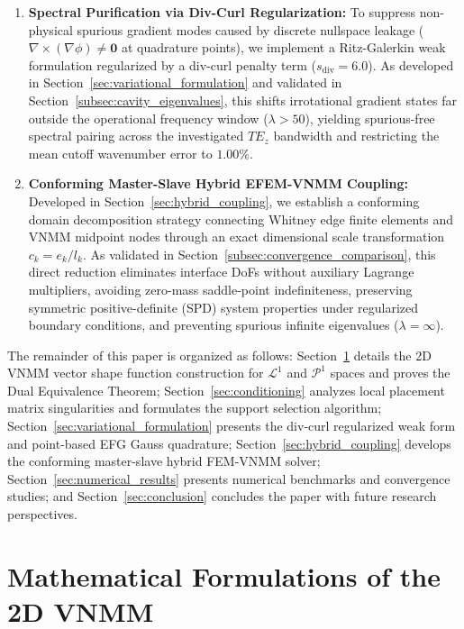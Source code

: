 \documentclass[preprint,12pt]{elsarticle}
\begin{document}
\begin{enumerate}
    \item \textbf{Spectral Purification via Div-Curl Regularization:} To suppress non-physical spurious gradient modes caused by discrete nullspace leakage ($\nabla \times (\nabla \phi) \neq \mathbf{0}$ at quadrature points), we implement a Ritz-Galerkin weak formulation regularized by a div-curl penalty term ($s_{\mathrm{div}} = 6.0$). As developed in Section~\ref{sec:variational_formulation} and validated in Section~\ref{subsec:cavity_eigenvalues}, this shifts irrotational gradient states far outside the operational frequency window ($\lambda > 50$), yielding spurious-free spectral pairing across the investigated $TE_z$ bandwidth and restricting the mean cutoff wavenumber error to $1.00\%$.
    
    \item \textbf{Conforming Master-Slave Hybrid EFEM-VNMM Coupling:} Developed in Section~\ref{sec:hybrid_coupling}, we establish a conforming domain decomposition strategy connecting Whitney edge finite elements and VNMM midpoint nodes through an exact dimensional scale transformation $c_k = e_k / l_k$. As validated in Section~\ref{subsec:convergence_comparison}, this direct reduction eliminates interface DoFs without auxiliary Lagrange multipliers, avoiding zero-mass saddle-point indefiniteness, preserving symmetric positive-definite (SPD) system properties under regularized boundary conditions, and preventing spurious infinite eigenvalues ($\lambda = \infty$).
\end{enumerate}


The remainder of this paper is organized as follows: Section~\ref{sec:formulations} details the 2D VNMM vector shape function construction for $\mathcal{L}^1$ and $\mathcal{P}^1$ spaces and proves the Dual Equivalence Theorem; Section~\ref{sec:conditioning} analyzes local placement matrix singularities and formulates the support selection algorithm; Section~\ref{sec:variational_formulation} presents the div-curl regularized weak form and point-based EFG Gauss quadrature; Section~\ref{sec:hybrid_coupling} develops the conforming master-slave hybrid FEM-VNMM solver; Section~\ref{sec:numerical_results} presents numerical benchmarks and convergence studies; and Section~\ref{sec:conclusion} concludes the paper with future research perspectives.

\section{Mathematical Formulations of the 2D VNMM}
\label{sec:formulations}
\end{document}
